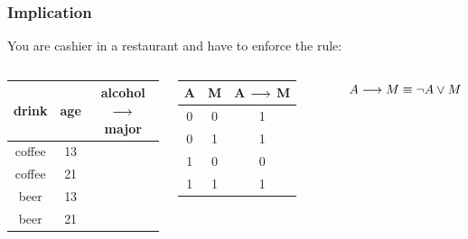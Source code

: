 \documentclass{beamer}
\begin{document}
\begin{frame}[fragile]\frametitle{Implication}

  You are cashier in a restaurant and have to enforce the rule:

  \begin{center}
  \end{center}

    \begin{columns}[t]
  \begin{tabular}{|c|c||c|}
    \hline
    drink & age & alcohol $\longrightarrow$ major	\\  \hline \hline
    coffee   &  13   & \pause \Smiley			\\ \hline
    coffee   &  21   & \pause \Smiley			\\ \hline
    beer     &  13   & \pause \Sadey			\\ \hline
    beer     &  21   & \pause \Smiley			\\ \hline
  \end{tabular}
  \pause
  \begin{tabular}{|c|c||c|}
    \hline
    A & M & A $\longrightarrow$ M	\\  \hline \hline
    0   &  0   & 	1		\\ \hline
    0   &  1   & 	1		\\ \hline
    1   &  0   & 	0		\\ \hline
    1   &  1   & 	1		\\ \hline
  \end{tabular}

  \vspace{3mm}
  $A \longrightarrow M \equiv \neg A \vee M$
\end{columns}

\end{frame}
\end{document}
